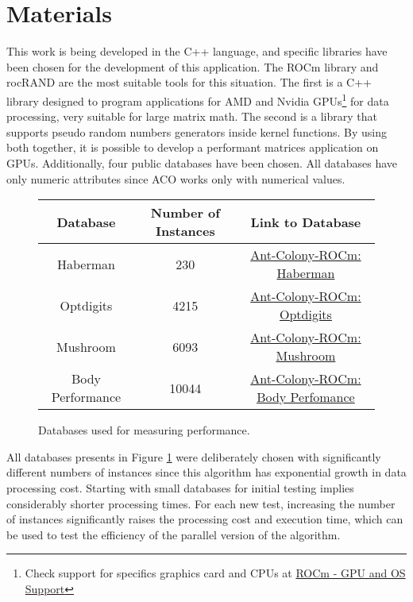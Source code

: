 \section{Materials} \label{Materials}

This work is being developed in the C++ language, and specific libraries have been chosen for the development of this application. The ROCm library\cite{rocm} and rocRAND\cite{rocrand} are the most suitable tools for this situation.
The first is a C++ library designed to program applications for AMD and Nvidia GPUs\footnote{Check support for specifics graphics card and CPUs at \href{https://rocm.docs.amd.com/en/latest/release/gpu_os_support.html}{ROCm - GPU and OS Support}} for data processing, very suitable for large matrix math.
The second is a library that supports pseudo random numbers generators inside kernel functions. By using both together, it is possible to develop a performant matrices application on GPUs.
Additionally, four public databases have been chosen. All databases have only numeric attributes since ACO works only with numerical values.

\begin{figure}[ht]
    \centering
    \begin{tabular}{|c|c|c|}
        \hline
        Database & Number of Instances & Link to Database \\
        \hline
        Haberman & 230 & \href{https://raw.githubusercontent.com/LucasSnatiago/Ant-Colony-ROCm/main/database/haberman_treino_normal.csv}{Ant-Colony-ROCm: Haberman} \\
        Optdigits & 4215 & \href{https://raw.githubusercontent.com/LucasSnatiago/Ant-Colony-ROCm/main/database/optdigits_treino_normal.csv}{Ant-Colony-ROCm: Optdigits} \\
        Mushroom & 6093 & \href{https://raw.githubusercontent.com/LucasSnatiago/Ant-Colony-ROCm/main/database/mushrooms_treino_normal.csv}{Ant-Colony-ROCm: Mushroom} \\
        Body Performance & 10044 & \href{https://raw.githubusercontent.com/LucasSnatiago/Ant-Colony-ROCm/main/database/body_performance_treino_normal.csv}{Ant-Colony-ROCm: Body Perfomance} \\
        \hline
    \end{tabular}
    \caption{Databases used for measuring performance.}
    \label{fig:datasets}
\end{figure}
All databases presents in Figure \ref{fig:datasets} were deliberately chosen with significantly different numbers of instances since this algorithm has exponential growth in data processing cost. Starting with small databases for initial testing implies considerably shorter processing times. For each new test, increasing the number of instances significantly raises the processing cost and execution time, which can be used to test the efficiency of the parallel version of the algorithm.

